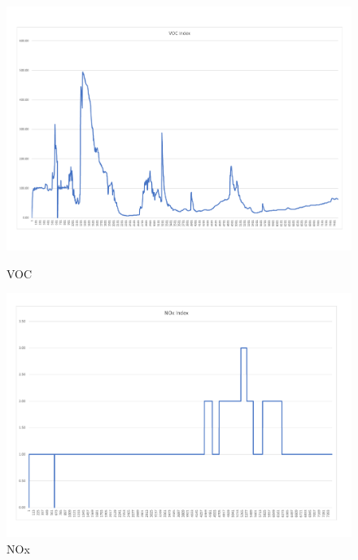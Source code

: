 \begin{figure}[!htb]
	\includegraphics[width=\linewidth]{body/fig/VOC.pdf}
	\caption{VOC}\label{fig:voc}
	\endminipage\hfill
	\includegraphics[width=\linewidth]{body/fig/NOX.pdf}
	\caption{NOx}\label{fig:nox}
	\endminipage\hfill

\end{figure}

